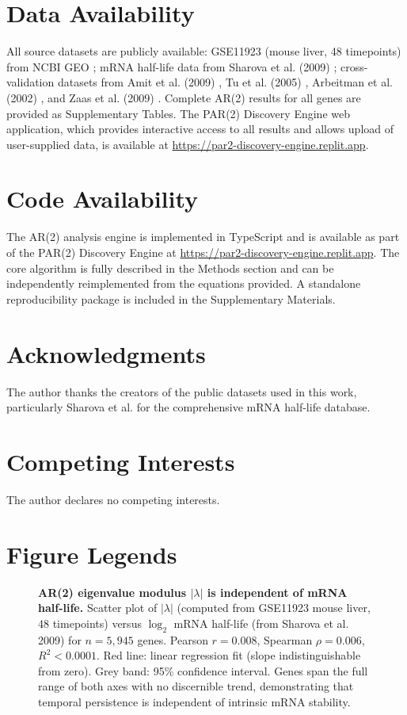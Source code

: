 \documentclass[11pt,letterpaper]{article}
\begin{document}
\section{Data Availability}

All source datasets are publicly available: GSE11923 (mouse liver, 48 timepoints) from NCBI GEO \citep{barrett2013ncbi}; mRNA half-life data from Sharova et al. (2009) \citep{sharova2009database}; cross-validation datasets from Amit et al. (2009) \citep{amit2009unbiased}, Tu et al. (2005) \citep{tu2005logic}, Arbeitman et al. (2002) \citep{arbeitman2002gene}, and Zaas et al. (2009) \citep{zaas2009gene}. Complete AR(2) results for all genes are provided as Supplementary Tables. The PAR(2) Discovery Engine web application, which provides interactive access to all results and allows upload of user-supplied data, is available at \url{https://par2-discovery-engine.replit.app}.

\section{Code Availability}

The AR(2) analysis engine is implemented in TypeScript and is available as part of the PAR(2) Discovery Engine at \url{https://par2-discovery-engine.replit.app}. The core algorithm is fully described in the Methods section and can be independently reimplemented from the equations provided. A standalone reproducibility package is included in the Supplementary Materials.

\section*{Acknowledgments}

The author thanks the creators of the public datasets used in this work, particularly Sharova et al. for the comprehensive mRNA half-life database.

\section*{Competing Interests}

The author declares no competing interests.

\section{Figure Legends}

\begin{figure}[H]
\caption{\textbf{AR(2) eigenvalue modulus $|\lambda|$ is independent of mRNA half-life.} Scatter plot of $|\lambda|$ (computed from GSE11923 mouse liver, 48 timepoints) versus $\log_2$ mRNA half-life (from Sharova et al. 2009) for $n = 5{,}945$ genes. Pearson $r = 0.008$, Spearman $\rho = 0.006$, $R^2 < 0.0001$. Red line: linear regression fit (slope indistinguishable from zero). Grey band: 95\% confidence interval. Genes span the full range of both axes with no discernible trend, demonstrating that temporal persistence is independent of intrinsic mRNA stability.}
\label{fig:scatter}
\end{figure}
\end{document}
